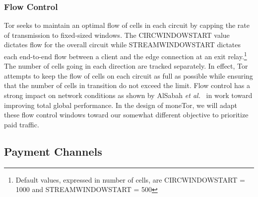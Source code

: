 \subsubsection{Flow Control} Tor seeks to maintain an optimal flow of cells in
each circuit by capping the rate of transmission to fixed-sized windows. The
CIRCWINDOWSTART value dictates flow for the overall circuit while
STREAMWINDOWSTART dictates each end-to-end flow between a client and the edge
connection at an exit relay.\footnote{Default values, expressed in number of
  cells, are CIRCWINDOWSTART = 1000 and STREAMWINDOWSTART = 500} The number of
cells going in each direction are tracked separately. In effect, Tor attempts to
keep the flow of cells on each circuit as full as possible while ensuring that
the number of cells in transition do not exceed the limit. Flow control has a
strong impact on network conditions as shown by AlSabah \textit{et
  al.}~\cite{pets2011-defenestrator} in work toward improving total global
performance.  In the design of moneTor, we will adapt these flow control windows
toward our somewhat different objective to prioritize paid traffic.

\subsection{Payment Channels}

%


